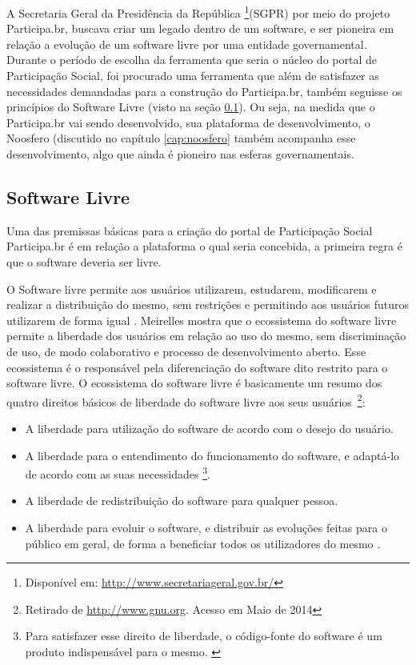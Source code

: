 A Secretaria Geral da Presidência da República \footnote{Disponível em: \url{http://www.secretariageral.gov.br/}}(SGPR) por meio do projeto Participa.br, buscava criar um legado dentro de um software, e ser pioneira em relação a evolução de um software livre por uma entidade governamental. Durante o período de escolha da ferramenta que seria o núcleo do portal de Participação Social, foi procurado uma ferramenta que além de satisfazer as necessidades demandadas para a construção do Participa.br, também seguisse os princípios do Software Livre (visto na seção \ref{sub:softwarelivre}). Ou seja, na medida que o Participa.br vai sendo desenvolvido, sua plataforma de desenvolvimento, o Noosfero (discutido no capítulo \ref{cap:noosfero} também acompanha esse desenvolvimento, algo que ainda é pioneiro nas esferas governamentais.

\subsection{Software Livre}
\label{sub:softwarelivre}

Uma das premissas básicas para a criação do portal de Participação Social Participa.br é em relação a plataforma o qual seria concebida, a primeira regra é que  o software deveria ser livre.

O Software livre permite aos usuários utilizarem, estudarem, modificarem e realizar a distribuição do mesmo, sem restrições e permitindo aos usuários futuros utilizarem de forma igual \cite{bucher2013rede}. Meirelles \citeyear{meirelles2013metricas} mostra que o ecossistema do software livre permite a liberdade dos usuários em relação ao uso do mesmo, sem discriminação de uso, de modo colaborativo e processo de desenvolvimento aberto. Esse ecossistema é o responsável pela diferenciação do software dito restrito para o software livre. O ecossistema do software livre é basicamente um resumo dos quatro direitos básicos de liberdade do software livre aos seus usuários~\footnote{Retirado de \url{http://www.gnu.org}. Acesso em Maio de 2014}:

\begin{itemize}
	\item A liberdade para utilização do software de acordo com o desejo do usuário.
	\item A liberdade para o entendimento do funcionamento do software, e adaptá-lo de acordo com as suas necessidades \footnote{Para satisfazer esse direito de liberdade, o código-fonte do software é um produto indispensável para o mesmo. \label{ft:codfonte}}.
	\item A liberdade de redistribuição do software para qualquer pessoa.
	\item A liberdade para evoluir o software, e distribuir as evoluções feitas para o público em geral, de forma a beneficiar todos os utilizadores do mesmo .
\end{itemize}


